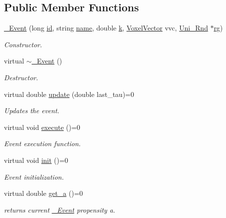 \subsection*{Public Member Functions}
\begin{DoxyCompactItemize}
\item 
\hyperlink{classnw_1_1___event_a5efb757db20b083de6da605ea4b2bbae}{\+\_\+\+Event} (long \hyperlink{classnw_1_1___event_a8f7ce287f596266dd763ec7db2f74090}{id}, string \hyperlink{classnw_1_1___event_ab4f50a54039cd4957bdca55049178562}{name}, double \hyperlink{classnw_1_1___event_afca0ae816e9834add07db8e9a6618faa}{k}, \hyperlink{namespacenw_ad7146b8b5a9de9be416847f41135722c}{Voxel\+Vector} vvc, \hyperlink{classnw_1_1_uni___rnd}{Uni\+\_\+\+Rnd} $\ast$\hyperlink{classnw_1_1___event_af92482aeea55562560573ecccd5ab108}{rg})
\begin{DoxyCompactList}\small\item\em Constructor. \end{DoxyCompactList}\item 
virtual \hyperlink{classnw_1_1___event_aede7a9b059e398c72320ad6d27ad6b2d}{$\sim$\+\_\+\+Event} ()
\begin{DoxyCompactList}\small\item\em Destructor. \end{DoxyCompactList}\item 
virtual double \hyperlink{classnw_1_1___event_a882115f8652c881bc8ed43f1050ccba3}{update} (double last\+\_\+tau)=0
\begin{DoxyCompactList}\small\item\em Updates the event. \end{DoxyCompactList}\item 
virtual void \hyperlink{classnw_1_1___event_aa022418fb765582a053ac75cbc3436d6}{execute} ()=0
\begin{DoxyCompactList}\small\item\em Event execution function. \end{DoxyCompactList}\item 
virtual void \hyperlink{classnw_1_1___event_ae2c608ee2508058d6f318ca2ca8f4317}{init} ()=0
\begin{DoxyCompactList}\small\item\em Event initialization. \end{DoxyCompactList}\item 
virtual double \hyperlink{classnw_1_1___event_a75945699f539cefab36eb6693a389918}{get\+\_\+a} ()=0
\begin{DoxyCompactList}\small\item\em returns current \hyperlink{classnw_1_1___event}{\+\_\+\+Event} propensity a. \end{DoxyCompactList}\item 

\end{DoxyCompactItemize}
